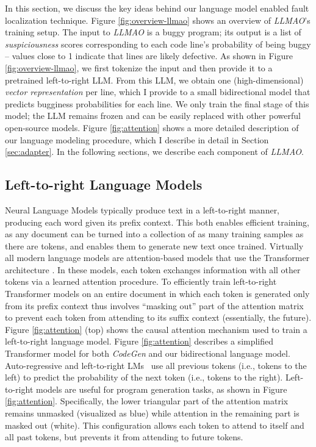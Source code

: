 \documentclass[12pt,openany,oneside,table]{cmuthesis}
\begin{document}
In this section, we discuss the key ideas behind our language model enabled fault localization technique.
Figure \ref{fig:overview-llmao} shows an overview of \textit{LLMAO}'s training setup. The input to \textit{LLMAO} is a buggy program; its output is a list of \emph{suspiciousness} scores corresponding to each code line's probability of being buggy -- values close to 1 indicate that lines are likely defective. As shown in Figure \ref{fig:overview-llmao}, we first tokenize the input and then provide it to a pretrained left-to-right LLM. From this LLM, we obtain one (high-dimensional) \emph{vector representation} per line, which I provide to a small bidirectional model that predicts bugginess probabilities for each line. We only train the final stage of this model; the LLM remains frozen and can be easily replaced with other powerful open-source models. Figure \ref{fig:attention} shows a more detailed description of our language modeling procedure, which I describe in detail in Section \ref{sec:adapter}.
In the following sections, we describe each component of \textit{LLMAO}.
    
\subsection{Left-to-right Language Models}
Neural Language Models typically produce text in a left-to-right manner, producing each word given its prefix context. This both enables efficient training, as any document can be turned into a collection of as many training samples as there are tokens, and enables them to generate new text once trained.
Virtually all modern language models are attention-based models that use the Transformer architecture \cite{vaswani2017attention}. In these models, each token exchanges information with all other tokens via a learned attention procedure. To efficiently train left-to-right Transformer models on an entire document in which each token is generated only from its prefix context thus involves ``masking out'' part of the attention matrix to prevent each token from attending to its suffix context (essentially, the future). 
Figure \ref{fig:attention} (top) shows the causal attention mechanism used to train a left-to-right language model. 
Figure \ref{fig:attention} describes a simplified Transformer model for both \textit{CodeGen} and our bidirectional language model.
Auto-regressive and left-to-right LMs~\cite{chen2021evaluating, black2021gpt, tunstall2022natural, nijkamp2022codegen} use all previous tokens (i.e., tokens to the left) to predict the probability of the next token (i.e., tokens to the right).
Left-to-right models are useful for program generation tasks, as shown in Figure \ref{fig:attention}.
Specifically, the lower triangular part of the attention matrix remains unmasked (visualized as blue) while attention in the remaining part is masked out (white). This configuration allows each token to attend to itself and all past tokens, but prevents it from attending to future tokens.
\end{document}
